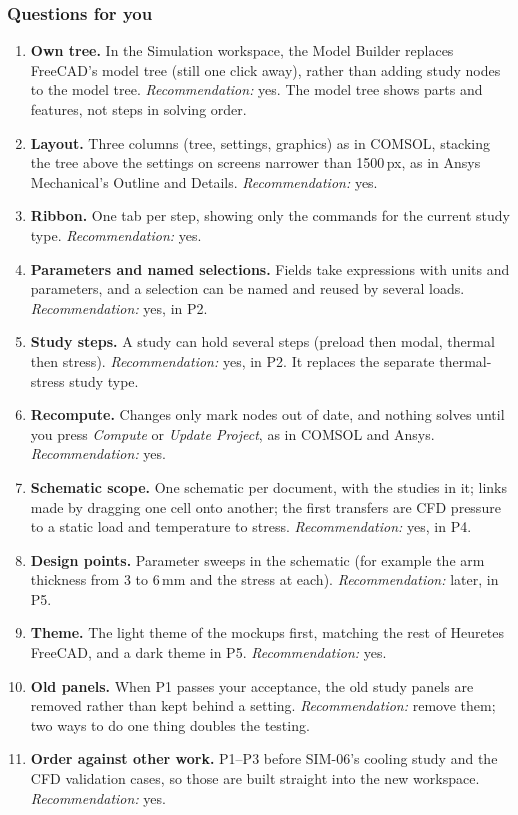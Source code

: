 \subsubsection*{Questions for you}
\begin{enumerate}[label=W\arabic*.]
  \item \textbf{Own tree.} In the Simulation workspace, the Model Builder replaces FreeCAD's model tree (still one
        click away), rather than adding study nodes to the model tree. \emph{Recommendation:} yes. The model tree
        shows parts and features, not steps in solving order.
  \item \textbf{Layout.} Three columns (tree, settings, graphics) as in COMSOL, stacking the tree above the
        settings on screens narrower than 1500\,px, as in Ansys Mechanical's Outline and Details.
        \emph{Recommendation:} yes.
  \item \textbf{Ribbon.} One tab per step, showing only the commands for the current study type.
        \emph{Recommendation:} yes.
  \item \textbf{Parameters and named selections.} Fields take expressions with units and parameters, and a
        selection can be named and reused by several loads. \emph{Recommendation:} yes, in P2.
  \item \textbf{Study steps.} A study can hold several steps (preload then modal, thermal then stress).
        \emph{Recommendation:} yes, in P2. It replaces the separate thermal-stress study type.
  \item \textbf{Recompute.} Changes only mark nodes out of date, and nothing solves until you press
        \emph{Compute} or \emph{Update Project}, as in COMSOL and Ansys. \emph{Recommendation:} yes.
  \item \textbf{Schematic scope.} One schematic per document, with the studies in it; links made by dragging one
        cell onto another; the first transfers are CFD pressure to a static load and temperature to stress.
        \emph{Recommendation:} yes, in P4.
  \item \textbf{Design points.} Parameter sweeps in the schematic (for example the arm thickness from 3 to 6\,mm
        and the stress at each). \emph{Recommendation:} later, in P5.
  \item \textbf{Theme.} The light theme of the mockups first, matching the rest of Heuretes FreeCAD, and a dark theme in
        P5. \emph{Recommendation:} yes.
  \item \textbf{Old panels.} When P1 passes your acceptance, the old study panels are removed rather than kept
        behind a setting. \emph{Recommendation:} remove them; two ways to do one thing doubles the testing.
  \item \textbf{Order against other work.} P1--P3 before SIM-06's cooling study and the CFD validation cases, so
        those are built straight into the new workspace. \emph{Recommendation:} yes.
\end{enumerate}

